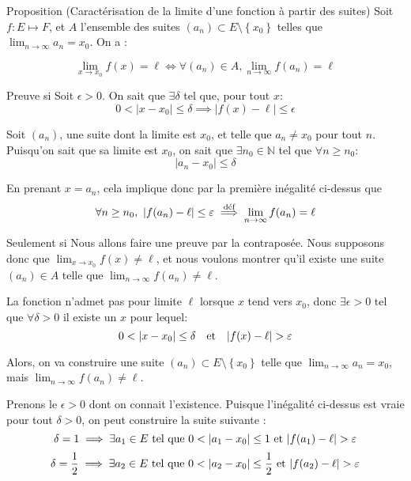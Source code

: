 \documentclass[a4paper]{article}
\begin{document}
\begin{parag}{Proposition (Caractérisation de la limite d'une fonction à partir des suites)}
        Soit $f : E \mapsto F$, et $A$ l'ensemble des suites $\left(a_n\right) \subset E \setminus \left\{x_0\right\}$ telles que $\lim_{n \to \infty} a_n = x_0$. On a :

        \[\lim_{x \to x_0} f\left(x\right) = \ell \iff \forall \left(a_n\right) \in A, \lim_{n \to \infty} f\left(a_n\right) = \ell\]

    \begin{subparag}{Preuve si}
            Soit $\epsilon > 0$. On sait que $\exists \delta$ tel que, pour tout $x$:
            \[0 < \left|x - x_0\right| \leq \delta \implies \left|f\left(x\right) - \ell\right| \leq \epsilon\]

            Soit $\left(a_n\right)$, une suite dont la limite est $x_0$, et telle que $a_n \neq x_0$ pour tout $n$. Puisqu'on sait que sa limite est $x_0$, on sait que $\exists n_0 \in \mathbb{N}$ tel que $\forall n \geq n_0$:
            \[\left|a_n - x_0\right| \leq \delta\]

            En prenant $x = a_n$, cela implique donc par la première inégalité ci-dessus que
            \[\forall n \geq n_0,\ \left|f\left(a_n\right) - \ell\right| \leq \epsilon \over{\implies}{déf} \lim_{n \to \infty} f\left(a_n\right) = \ell\]
    \end{subparag}

    \begin{subparag}{Seulement si}
            Nous allons faire une preuve par la contraposée. Nous supposons donc que $\lim_{x \to x_0} f\left(x\right) \neq \ell$, et nous voulons montrer qu'il existe une suite $\left(a_n\right) \in A$ telle que $\lim_{n \to \infty} f\left(a_n\right) \neq \ell$.

            La fonction n'admet pas pour limite $\ell$ lorsque $x$ tend vers $x_0$, donc $\exists \epsilon > 0$ tel que $\forall \delta > 0$ il existe un $x$ pour lequel:
            \[0 < \left|x - x_0\right| \leq \delta \mathspace \text{et} \mathspace \left|f\left(x\right) - \ell\right| > \epsilon\]

            Alors, on va construire une suite $\left(a_n\right) \subset E \setminus \left\{x_0\right\}$ telle que $\lim_{n \to \infty} a_n = x_0$, mais $\lim_{n \to \infty} f\left(a_n\right) \neq \ell$.

            Prenons le $\epsilon > 0$ dont on connait l'existence. Puisque l'inégalité ci-dessus est vraie pour tout $\delta > 0$, on peut construire la suite suivante :
            \[\delta = 1 \implies \exists a_1 \in E \telque 0 < \left|a_1 - x_0\right| \leq 1 \text{ et } \left|f\left(a_1\right) - \ell\right| > \epsilon\]
            \[\delta = \frac{1}{2} \implies \exists a_2 \in E \telque 0 < \left|a_2 - x_0\right| \leq \frac{1}{2} \text{ et } \left|f\left(a_2\right) - \ell\right| > \epsilon\]


\end{subparag}
\end{parag}
\end{document}
